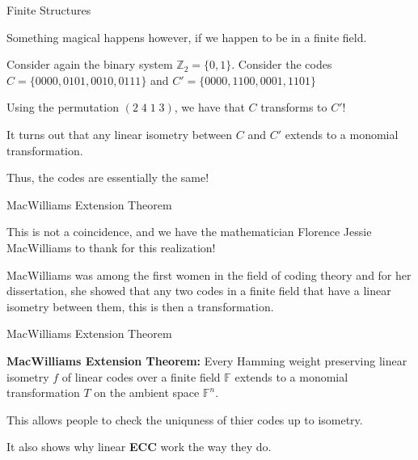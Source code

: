 \documentclass{beamer}
\begin{document}
\begin{frame}{Finite Structures}
    
    Something magical happens however, if we happen to be in a finite field.

    \medskip

    Consider again the binary system $\mathbb{Z}_2=\{0,1\}$. Consider the codes
    $C=\{0000,0101,0010,0111\}$ and $C'=\{0000,1100,0001,1101\}$

    \medskip

    Using the permutation $(2\;4\;1\;3)$, we have that $C$ transforms to $C'$!
    
    \bigskip

    \pause

    It turns out that any linear isometry between $C$ and $C'$ extends to a monomial transformation.\\

    \pause

    Thus, the codes are essentially the same!

\end{frame}

\begin{frame}{MacWilliams Extension Theorem}
    
    This is not a coincidence, and we have the mathematician Florence Jessie MacWilliams to thank for
    this realization!

    \medskip
    
    \pause

    MacWilliams was among the first women in the field of coding theory and for her dissertation, she showed
    that any two codes in a finite field that have a linear isometry between them, this is then a
    transformation.

\end{frame}

\begin{frame}{MacWilliams Extension Theorem}
    
    \textbf{MacWilliams Extension Theorem:} Every Hamming weight preserving linear isometry $f$ of
    linear codes over a finite field $\mathbb{F}$ extends to a monomial transformation $T$ on the
    ambient space $\mathbb{F}^n$.

\end{frame}

\begin{frame}
    
    This allows people to check the uniquness of thier codes up to isometry.

    \medskip

    It also shows why linear \textbf{ECC} work the way they do.

\end{frame}
\end{document}
